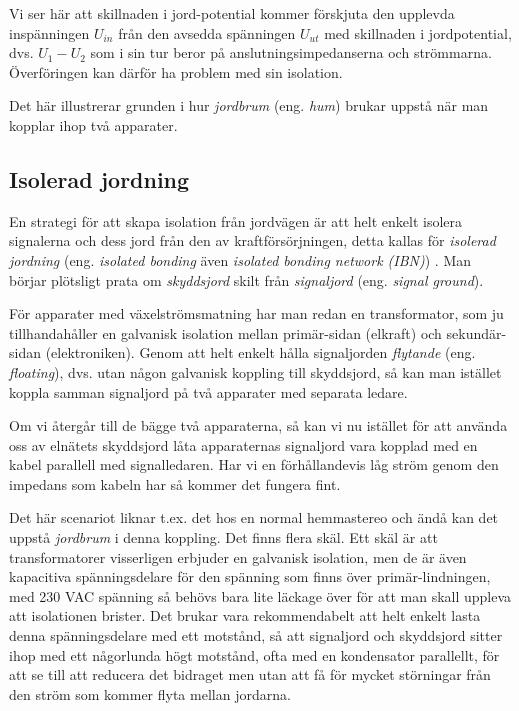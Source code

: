Vi ser här att skillnaden i jord-potential kommer förskjuta den upplevda
inspänningen \(U_{in}\) från den avsedda spänningen \(U_{ut}\) med skillnaden i
jordpotential, dvs. \(U_1 - U_2\) som i sin tur beror på anslutningsimpedanserna
och strömmarna. Överföringen kan därför ha problem med sin isolation.

Det här illustrerar grunden i hur \emph{jordbrum} (eng. \emph{hum}) brukar
uppstå när man kopplar ihop två apparater.

\subsection{Isolerad jordning}

En strategi för att skapa isolation från jordvägen är att helt enkelt
isolera signalerna och dess jord från den av kraftförsörjningen, detta kallas
för \emph{isolerad jordning} (eng. \emph{isolated bonding} även \emph{isolated
bonding network (IBN)}) \cite[3.2.4]{K27-1991}.
Man börjar plötsligt prata om \emph{skyddsjord} skilt från \emph{signaljord}
(eng. \emph{signal ground}).

För apparater med växelströmsmatning har man redan en transformator, som ju
tillhandahåller en galvanisk isolation mellan primär-sidan (elkraft) och
sekundär-sidan (elektroniken). Genom att helt enkelt hålla signaljorden
\emph{flytande} (eng. \emph{floating}), dvs. utan någon galvanisk koppling
till skyddsjord, så kan man istället koppla samman signaljord på två apparater
med separata ledare.

Om vi återgår till de bägge två apparaterna, så kan vi nu istället för att
använda oss av elnätets skyddsjord låta apparaternas signaljord vara kopplad
med en kabel parallell med signalledaren. Har vi en förhållandevis låg ström
genom den impedans som kabeln har så kommer det fungera fint.

Det här scenariot liknar t.ex. det hos en normal hemmastereo och ändå kan det
uppstå \emph{jordbrum} i denna koppling. Det finns flera skäl. Ett skäl är att
transformatorer visserligen erbjuder en galvanisk isolation, men de är även
kapacitiva spänningsdelare för den spänning som finns över primär-lindningen,
med 230 VAC spänning så behövs bara lite läckage över för att man skall
uppleva att isolationen brister. Det brukar vara rekommendabelt att helt
enkelt lasta denna spänningsdelare med ett motstånd, så att signaljord och
skyddsjord sitter ihop med ett någorlunda högt motstånd, ofta med en
kondensator parallellt, för att se till att reducera det bidraget men utan att
få för mycket störningar från den ström som kommer flyta mellan jordarna.

